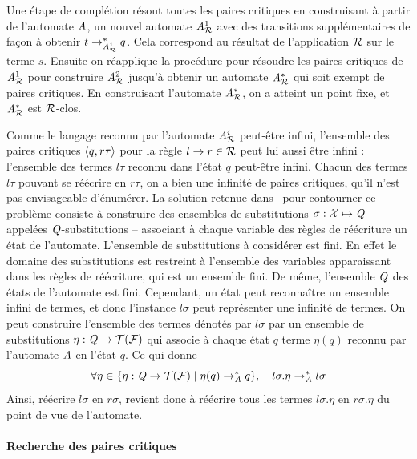 
Une étape de complétion résout toutes les paires critiques en construisant
à partir de l'automate $\mathit A$, un nouvel automate ${\mathit A}_{\mathcal R}^1$ avec des transitions
supplémentaires de façon à obtenir $t \rightarrow_{{\mathit A}_{\mathcal R}^1}^* q$. Cela correspond
au résultat de l'application $\mathcal R$ sur le terme $s$. Ensuite on réapplique la procédure
pour résoudre les paires critiques de ${\mathit A}_{\mathcal R}^1$ pour construire ${\mathit A}_{\mathcal R}^2$ jusqu'à obtenir
un automate ${\mathit A}_{\mathcal R}^*$ qui soit exempt de paires critiques. En construisant l'automate ${\mathit A}_{\mathcal R}^*$,
on a atteint un point fixe, et ${\mathit A}_{\mathcal R}^*$ est $\mathcal R$-clos.

Comme le langage reconnu par l'automate ${\mathit A}_{\mathcal R}^i$ peut-être infini, l'ensemble
des paires critiques $\langle q, r\tau\rangle$ pour la règle $l\rightarrow r\in \mathcal R$ peut lui aussi être infini : 
l'ensemble des termes $l\tau$ reconnu dans l'état $q$ peut-être infini. Chacun des termes $l\tau$
pouvant se réécrire en $r\tau$, on a bien une infinité de paires critiques, qu'il n'est pas envisageable
d'énumérer.
La solution retenue dans~\cite{Genet-RTA98} pour contourner ce problème consiste à construire des ensembles de
substitutions $\sigma: \mathcal X \mapsto \mathit Q$ -- appelées $\mathit Q$-substitutions -- associant à chaque variable des règles de réécriture 
un état de l'automate. L'ensemble de substitutions à considérer est fini. En effet le domaine des substitutions est restreint à l'ensemble des
variables apparaissant dans les règles de réécriture, qui est un ensemble fini. De même, l'ensemble $\mathit Q$ des états de l'automate est fini.
Cependant, un état peut reconnaître un ensemble infini de termes, et donc l'instance $l\sigma$ peut représenter une infinité de termes.
On peut construire l'ensemble des termes dénotés par $l\sigma$ par un ensemble de substitutions $\eta: \mathit Q \rightarrow \mathcal{T(F)}$ qui associe à chaque état $q$ 
terme $\eta(q)$ reconnu par l'automate $\mathit A$ en l'état $q$. %
Ce qui donne 
\[\forall \eta \in \{ \eta : \mathit Q \rightarrow \mathcal{T(F)} \; | \; \eta(q) \rightarrow_\mathit A^* q\},\quad l\sigma.\eta \rightarrow^*_\mathit A  l\sigma\]
Ainsi, réécrire $l\sigma$ en $r\sigma$, revient donc à réécrire tous les termes $l\sigma.\eta$ en $r\sigma.\eta$ du point de vue de l'automate.

\paragraph{Recherche des paires critiques}
\label{sec:recherche-des-paires}

